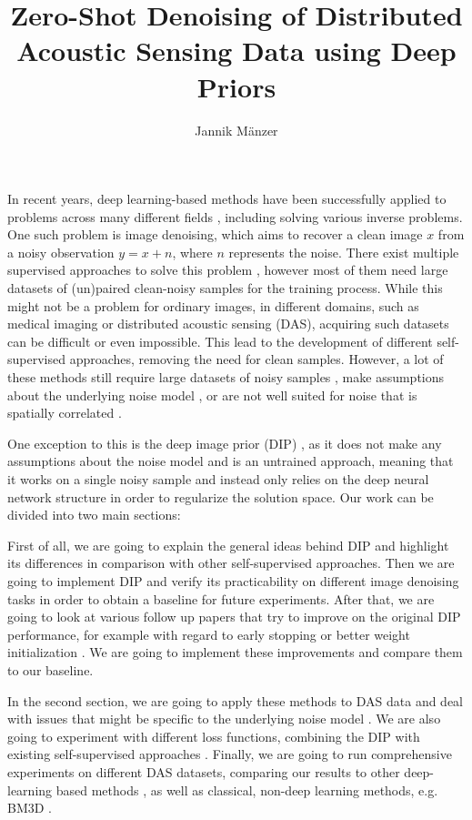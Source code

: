 \documentclass[a4paper, 12pt]{article}
\title{\textbf{Zero-Shot Denoising of Distributed Acoustic Sensing Data using Deep Priors}}
\author{Jannik Mänzer}
\date{}
\begin{document}
\maketitle

In recent years, deep learning-based methods have been successfully applied to problems across many different fields \cite{ImageNet, GAN, GPT3}, including solving various inverse problems. One such problem is image denoising, which aims to recover a clean image $x$ from a noisy observation $y = x + n$, where $n$ represents the noise. There exist multiple supervised approaches to solve this problem \cite{DnCNN, GCBD}, however most of them need large datasets of (un)paired clean-noisy samples for the training process. While this might not be a problem for ordinary images, in different domains, such as medical imaging or distributed acoustic sensing (DAS), acquiring such datasets can be difficult or even impossible. This lead to the development of different self-supervised approaches, removing the need for clean samples. However, a lot of these methods still require large datasets of noisy samples \cite{Noise2Noise}, make assumptions about the underlying noise model \cite{Noisier2Noise}, or are not well suited for noise that is spatially correlated \cite{Noise2Self}.

One exception to this is the deep image prior (DIP) \cite{DIP}, as it does not make any assumptions about the noise model and is an untrained approach, meaning that it works on a single noisy sample and instead only relies on the deep neural network structure in order to regularize the solution space. Our work can be divided into two main sections:

First of all, we are going to explain the general ideas behind DIP and highlight its differences in comparison with other self-supervised approaches. Then we are going to implement DIP and verify its practicability on different image denoising tasks in order to obtain a baseline for future experiments. After that, we are going to look at various follow up papers that try to improve on the original DIP performance, for example with regard to early stopping \cite{EarlyStopping, RethinkingDIP} or better weight initialization \cite{MetaDIP, EDIP}. We are going to implement these improvements and compare them to our baseline.

In the second section, we are going to apply these methods to DAS data and deal with issues that might be specific to the underlying noise model \cite{SelfMixed}. We are also going to experiment with different loss functions, combining the DIP with existing self-supervised approaches \cite{DDIP, Noise2Self, Noise2Same}. Finally, we are going to run comprehensive experiments on different DAS datasets, comparing our results to other deep-learning based methods \cite{DAS-N2N, DAS-J-invariant, SelfMixed}, as well as classical, non-deep learning methods, e.g. BM3D \cite{BM3D}.

\printbibliography
\end{document}
